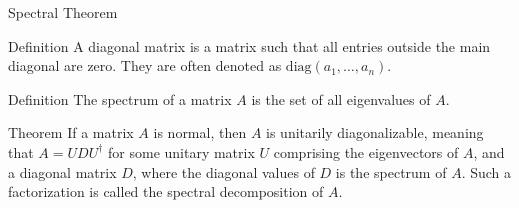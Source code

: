 \documentclass{beamer}
\newcommand{\diag}{\text{diag}}
\begin{document}
\begin{frame}{Spectral Theorem}

\begin{block}{Definition}
A diagonal matrix is a matrix such that all entries outside the main diagonal are zero. They are often denoted as $\diag(a_1, \ldots, a_n)$.
\end{block}

\begin{block}{Definition}
The spectrum of a matrix $A$ is the set of all eigenvalues of $A$.
\end{block}

\begin{block}{Theorem}
If a matrix $A$ is normal, then $A$ is unitarily diagonalizable, meaning that $A=UDU^\dagger$ for some unitary matrix $U$ comprising the eigenvectors of $A$, and a diagonal matrix $D$, where the diagonal values of $D$ is the spectrum of $A$. Such a factorization is called the spectral decomposition of $A$.
\end{block}

\end{frame}
\end{document}
